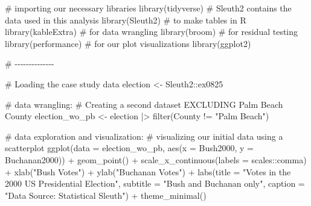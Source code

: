 \documentclass[
  letterpaper,
  DIV=11,
  numbers=noendperiod]{scrartcl}
\newenvironment{Shaded}{\begin{snugshade}}{\end{snugshade}}
\newcommand{\AttributeTok}[1]{\textcolor[rgb]{0.40,0.45,0.13}{#1}}
\newcommand{\CommentTok}[1]{\textcolor[rgb]{0.37,0.37,0.37}{#1}}
\newcommand{\FunctionTok}[1]{\textcolor[rgb]{0.28,0.35,0.67}{#1}}
\newcommand{\NormalTok}[1]{\textcolor[rgb]{0.00,0.23,0.31}{#1}}
\newcommand{\OtherTok}[1]{\textcolor[rgb]{0.00,0.23,0.31}{#1}}
\newcommand{\SpecialCharTok}[1]{\textcolor[rgb]{0.37,0.37,0.37}{#1}}
\newcommand{\StringTok}[1]{\textcolor[rgb]{0.13,0.47,0.30}{#1}}
\begin{document}
\begin{Shaded}
\begin{Highlighting}[]
\CommentTok{\# importing our necessary libraries}
\FunctionTok{library}\NormalTok{(tidyverse)}
\CommentTok{\# Sleuth2 contains the data used in this analysis}
\FunctionTok{library}\NormalTok{(Sleuth2) }
\CommentTok{\# to make tables in R}
\FunctionTok{library}\NormalTok{(kableExtra) }
\CommentTok{\# for data wrangling}
\FunctionTok{library}\NormalTok{(broom)}
\CommentTok{\# for residual testing}
\FunctionTok{library}\NormalTok{(performance)}
\CommentTok{\# for our plot visualizations}
\FunctionTok{library}\NormalTok{(ggplot2)}

\CommentTok{\# {-}{-}{-}{-}{-}{-}{-}{-}{-}{-}{-}{-}{-}{-}}

\CommentTok{\# Loading the case study data}
\NormalTok{election }\OtherTok{\textless{}{-}}\NormalTok{ Sleuth2}\SpecialCharTok{::}\NormalTok{ex0825}

\CommentTok{\# data wrangling:}
\CommentTok{\# Creating a second dataset EXCLUDING Palm Beach County }
\NormalTok{election\_wo\_pb }\OtherTok{\textless{}{-}}\NormalTok{ election }\SpecialCharTok{|\textgreater{}} \FunctionTok{filter}\NormalTok{(County }\SpecialCharTok{!=} \StringTok{"Palm Beach"}\NormalTok{)}

\CommentTok{\# data exploration and visualization: }
\CommentTok{\# visualizing our initial data using a scatterplot}
\FunctionTok{ggplot}\NormalTok{(}\AttributeTok{data =}\NormalTok{ election\_wo\_pb, }\FunctionTok{aes}\NormalTok{(}\AttributeTok{x =}\NormalTok{ Bush2000, }\AttributeTok{y =}\NormalTok{ Buchanan2000)) }\SpecialCharTok{+}
  \FunctionTok{geom\_point}\NormalTok{() }\SpecialCharTok{+}
  \FunctionTok{scale\_x\_continuous}\NormalTok{(}\AttributeTok{labels =}\NormalTok{ scales}\SpecialCharTok{::}\NormalTok{comma) }\SpecialCharTok{+} 
  \FunctionTok{xlab}\NormalTok{(}\StringTok{"Bush Votes"}\NormalTok{) }\SpecialCharTok{+}
  \FunctionTok{ylab}\NormalTok{(}\StringTok{"Buchanan Votes"}\NormalTok{) }\SpecialCharTok{+} 
  \FunctionTok{labs}\NormalTok{(}\AttributeTok{title =} \StringTok{"Votes in the 2000 US Presidential Election"}\NormalTok{, }\AttributeTok{subtitle =} \StringTok{"Bush and Buchanan only"}\NormalTok{, }\AttributeTok{caption =} \StringTok{"Data Source: Statistical Sleuth"}\NormalTok{) }\SpecialCharTok{+}
  \FunctionTok{theme\_minimal}\NormalTok{()}
\end{Highlighting}
\end{Shaded}
\end{document}
